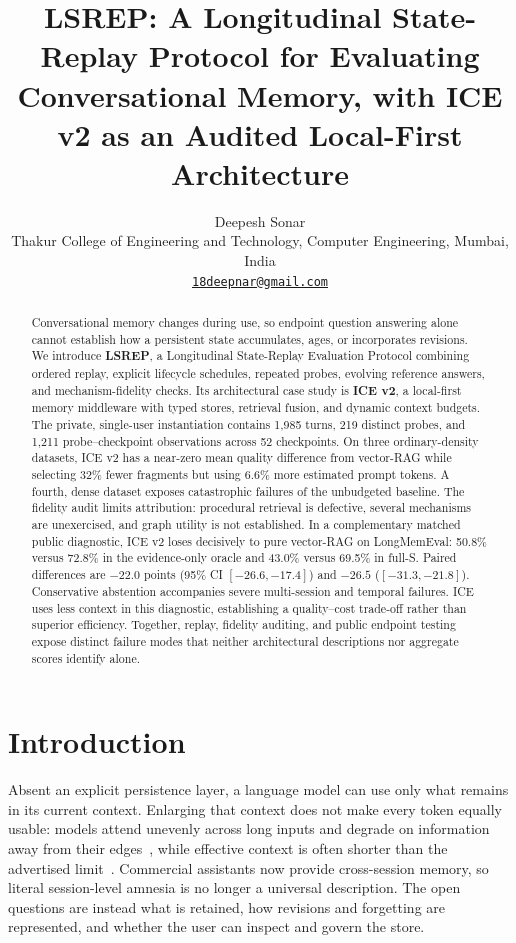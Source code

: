 \documentclass[11pt,a4paper]{article}
\title{\bfseries LSREP: A Longitudinal State-Replay Protocol for Evaluating Conversational Memory, with ICE v2 as an Audited Local-First Architecture}
\author{Deepesh Sonar\\[2pt]
  \normalsize Thakur College of Engineering and Technology, Computer Engineering, Mumbai, India\\
  \normalsize\href{mailto:18deepnar@gmail.com}{\texttt{18deepnar@gmail.com}}}
\date{}
\begin{document}
\maketitle
\thispagestyle{empty}

\begin{abstract}
Conversational memory changes during use, so endpoint question answering alone cannot establish how a persistent state accumulates, ages, or incorporates revisions. We introduce \textbf{LSREP}, a Longitudinal State-Replay Evaluation Protocol combining ordered replay, explicit lifecycle schedules, repeated probes, evolving reference answers, and mechanism-fidelity checks. Its architectural case study is \textbf{ICE v2}, a local-first memory middleware with typed stores, retrieval fusion, and dynamic context budgets. The private, single-user instantiation contains 1,985 turns, 219 distinct probes, and 1,211 probe--checkpoint observations across 52 checkpoints. On three ordinary-density datasets, ICE v2 has a near-zero mean quality difference from vector-RAG while selecting 32\% fewer fragments but using 6.6\% more estimated prompt tokens. A fourth, dense dataset exposes catastrophic failures of the unbudgeted baseline. The fidelity audit limits attribution: procedural retrieval is defective, several mechanisms are unexercised, and graph utility is not established. In a complementary matched public diagnostic, ICE v2 loses decisively to pure vector-RAG on LongMemEval: 50.8\% versus 72.8\% in the evidence-only oracle and 43.0\% versus 69.5\% in full-S. Paired differences are $-22.0$ points (95\% CI $[-26.6,-17.4]$) and $-26.5$ ($[-31.3,-21.8]$). Conservative abstention accompanies severe multi-session and temporal failures. ICE uses less context in this diagnostic, establishing a quality--cost trade-off rather than superior efficiency. Together, replay, fidelity auditing, and public endpoint testing expose distinct failure modes that neither architectural descriptions nor aggregate scores identify alone.
\end{abstract}

\section{Introduction}
\label{sec:intro}

Absent an explicit persistence layer, a language model can use only what remains in its current context. Enlarging that context does not make every token equally usable: models attend unevenly across long inputs and degrade on information away from their edges~\citep{liu2024lost}, while effective context is often shorter than the advertised limit~\citep{hsieh2024ruler}. Commercial assistants now provide cross-session memory, so literal session-level amnesia is no longer a universal description. The open questions are instead what is retained, how revisions and forgetting are represented, and whether the user can inspect and govern the store.
\end{document}
